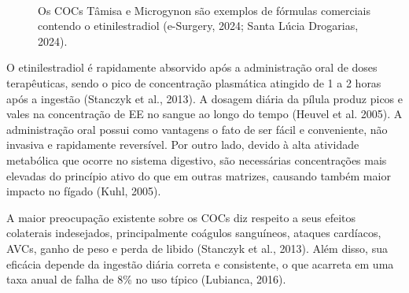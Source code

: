 \begin{figure}[!htb]
    \begin{center}
    \hfill
    \par
    \caption[COCs comerciais]{Os COCs Tâmisa\textsuperscript{\textregistered}  e Microgynon\textsuperscript{\textregistered}   são exemplos de fórmulas comerciais contendo o etinilestradiol (e-Surgery, 2024; Santa Lúcia Drogarias, 2024).}
    \label{fig:pills}
    \end{center}
\end{figure}

O etinilestradiol é rapidamente absorvido após a administração oral de doses terapêuticas, sendo o pico de concentração plasmática atingido de 1 a 2 horas após a ingestão (Stanczyk et al., 2013). A dosagem diária da pílula produz picos e vales na concentração de EE no sangue ao longo do tempo (Heuvel et al. 2005). A administração oral possui como vantagens o fato de ser fácil e conveniente, não invasiva e rapidamente reversível. Por outro lado, devido à alta atividade metabólica que ocorre no sistema digestivo, são necessárias concentrações mais elevadas do princípio ativo do que em outras matrizes, causando também maior impacto no fígado (Kuhl, 2005).

A maior preocupação existente sobre os COCs diz respeito a seus efeitos colaterais indesejados, principalmente coágulos sanguíneos, ataques cardíacos, AVCs, ganho de peso e perda de libido (Stanczyk et al., 2013). Além disso, sua eficácia depende da ingestão diária correta e consistente, o que acarreta em uma taxa anual de falha de 8\% no uso típico (Lubianca, 2016). 

